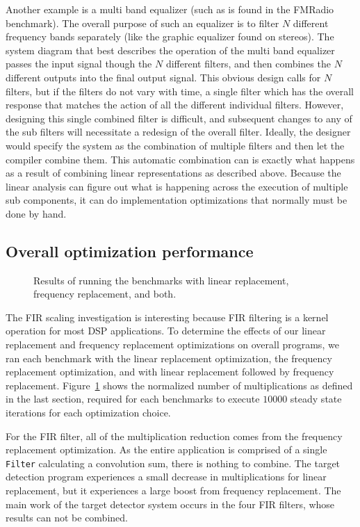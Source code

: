 Another example is a multi band equalizer (such as is found in the FMRadio benchmark). 
The overall purpose of such an equalizer is to filter $N$ different frequency bands 
separately (like the graphic equalizer found on stereos). 
The system diagram that best describes the operation of the multi band equalizer
passes the input signal though the $N$ different filters, and then combines the $N$
different outputs into the final output signal.
This obvious design calls for $N$ filters, but if the filters do not vary with time, 
a single filter which has the overall response that matches the action of all the 
different individual filters. However, designing this single combined filter is 
difficult, and subsequent changes to any of the sub filters will necessitate a
redesign of the overall filter. Ideally, the designer would specify the system as
the combination of multiple filters and then let the compiler combine them. 
This automatic combination can is exactly what happens as a result of combining
linear representations as described above. Because the linear analysis can
figure out what is happening across the execution of multiple sub components, 
it can do implementation optimizations that normally must be done by hand.


\subsection{Overall optimization performance}

\begin{figure}
\center
\epsfxsize=3.0in
\caption{Results of running the benchmarks with linear replacement, frequency replacement, and both.}
\label{fig:linear-freq-both}
\end{figure}

The FIR scaling investigation is interesting because FIR filtering is a kernel
operation for most DSP applications. To determine the effects of our linear
replacement and frequency replacement optimizations on overall programs, we ran
each benchmark with the linear replacement optimization, the frequency replacement
optimization, and with linear replacement followed by frequency replacement. 
Figure~\ref{fig:linear-freq-both} shows the normalized number of 
multiplications as defined in the last section, required for each 
benchmarks to execute $10000$ steady state iterations for each optimization choice.

For the FIR filter, all of the multiplication reduction comes from the frequency
replacement optimization. As the entire application is comprised of a single
{\tt Filter} calculating a convolution sum, there is nothing to combine.
The target detection program experiences a small decrease in multiplications 
for linear replacement, but it experiences a large boost from frequency replacement.
The main work of the target detector system occurs in the four FIR filters, whose
results can not be combined.

